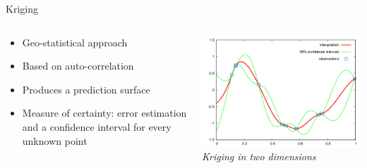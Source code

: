 \begin{frame}{Kriging}
\begin{columns}[T] %
	\begin{column}{.52\textwidth}
		\begin{itemize}
			\item Geo-statistical approach
			\item Based on auto-correlation
			\item Produces a prediction surface
			\item Measure of certainty: error estimation and a confidence interval for every unknown point
		\end{itemize}
	\end{column}%
	\hfill%
	\begin{column}{.48\textwidth}
		\includegraphics[width=\linewidth]{../writeup/images/kriging.png}\\
		\textit{\footnotesize Kriging in two dimensions \cite{gitta_raumliche_2016}}
	\end{column}%
\end{columns}
\end{frame}
